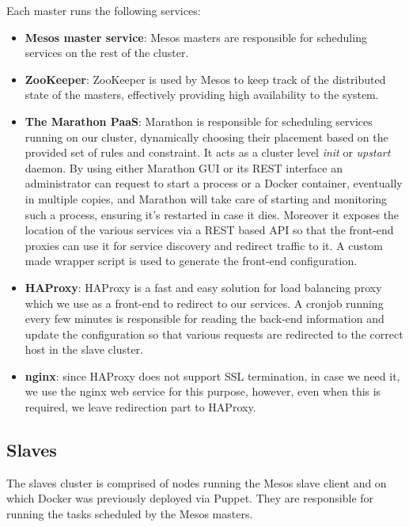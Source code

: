 \documentclass[a4paper]{jpconf}
\begin{document}
Each master runs the following services:

\begin{itemize}

\item \textbf{Mesos master service}: Mesos masters are responsible for
scheduling services on the rest of the cluster.

\item \textbf{ZooKeeper}: ZooKeeper is used by Mesos to keep track of the
distributed state of the masters, effectively providing high availability to the
system.

\item \textbf{The Marathon PaaS}: Marathon is responsible for scheduling
services running on our cluster, dynamically choosing their placement based on
the provided set of rules and constraint. It acts as a cluster level
\textit{init} or \textit{upstart} daemon.  By using either Marathon GUI or its
REST interface an administrator can request to start a process or a Docker
container, eventually in multiple copies, and Marathon will take care of
starting and monitoring such a process, ensuring it's restarted in case it
dies. Moreover it exposes the location of the various services via a REST based
API so that the front-end proxies can use it for service discovery and redirect
traffic to it. A custom made wrapper script is used to generate the front-end
configuration.

\item \textbf{HAProxy}: HAProxy is a fast and easy solution for load
balancing proxy which we use as a front-end to redirect to our services.
A cronjob running every few minutes is responsible for reading the
back-end information and update the configuration so that various
requests are redirected to the correct host in the slave cluster.

\item \textbf{nginx}: since HAProxy does not support SSL termination, in case we
need it, we use the nginx web service for this purpose, however, even when this
is required, we leave redirection part to HAProxy.

\end{itemize}

\subsection{Slaves}

The slaves cluster is comprised of nodes running the Mesos slave client and on
which Docker was previously deployed via Puppet. They are responsible for
running the tasks scheduled by the Mesos masters.
\end{document}
